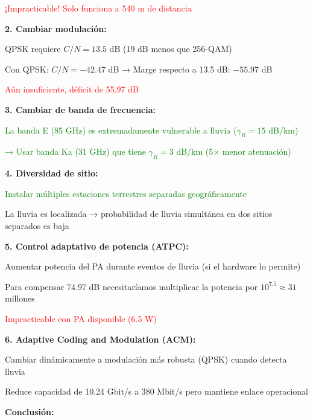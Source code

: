 \documentclass[12pt,a4paper]{extarticle}
\begin{document}
\textcolor{red}{¡Impracticable! Solo funciona a 540 m de distancia}

\textbf{2. Cambiar modulación:}

QPSK requiere $C/N = 13.5$ dB (19 dB menos que 256-QAM)

Con QPSK: $C/N = -42.47$ dB → Marge respecto a 13.5 dB: $-55.97$ dB

\textcolor{red}{Aún insuficiente, déficit de 55.97 dB}

\textbf{3. Cambiar de banda de frecuencia:}

\textcolor{green}{La banda E (85 GHz) es extremadamente vulnerable a lluvia ($\gamma_R = 15$ dB/km)}

\textcolor{green}{→ Usar banda Ka (31 GHz) que tiene $\gamma_R = 3$ dB/km (5× menor atenuación)}

\textbf{4. Diversidad de sitio:}

\textcolor{green}{Instalar múltiples estaciones terrestres separadas geográficamente}

La lluvia es localizada → probabilidad de lluvia simultánea en dos sitios separados es baja

\textbf{5. Control adaptativo de potencia (ATPC):}

Aumentar potencia del PA durante eventos de lluvia (si el hardware lo permite)

Para compensar 74.97 dB necesitaríamos multiplicar la potencia por $10^{7.5} \approx 31$ millones

\textcolor{red}{Impracticable con PA disponible (6.5 W)}

\textbf{6. Adaptive Coding and Modulation (ACM):}

Cambiar dinámicamente a modulación más robusta (QPSK) cuando detecta lluvia

Reduce capacidad de 10.24 Gbit/s a 380 Mbit/s pero mantiene enlace operacional

\textbf{Conclusión:}

\begin{center}
\end{center}
\end{document}
